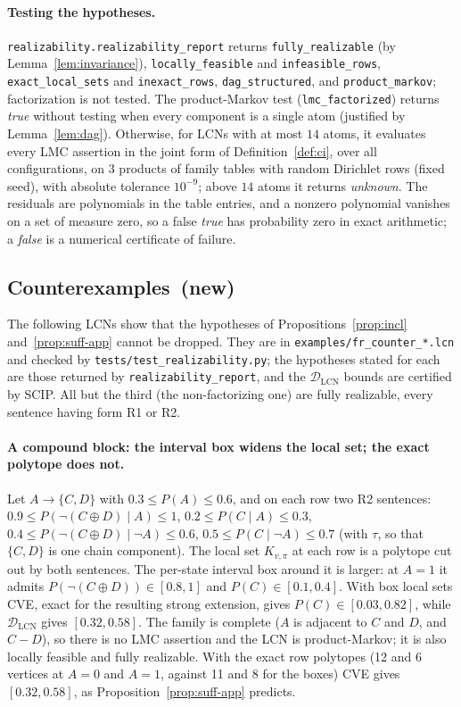 \documentclass{article} %
\DeclareRobustCommand{\rev}[1]{{\color{blue}#1}}
\newcommand{\newtag}{\texorpdfstring{~\rev{(new)}}{}}
\newcommand{\DLCN}{\mathcal{D}_{\mathrm{LCN}}}
\begin{document}
\paragraph{Testing the hypotheses.} \texttt{realizability.realizability\_report} returns
\texttt{fully\_realizable} (by Lemma~\ref{lem:invariance}), \texttt{locally\_feasible} and
\texttt{infeasible\_rows}, \texttt{exact\_local\_sets} and \texttt{inexact\_rows},
\texttt{dag\_structured}, and \texttt{product\_markov}; factorization is not tested. The
product-Markov test (\texttt{lmc\_factorized}) returns \emph{true} without testing when every
component is a single atom (justified by Lemma~\ref{lem:dag}). Otherwise, for LCNs with at most $14$
atoms, it evaluates every LMC assertion in the joint form of Definition~\ref{def:ci}, over all
configurations, on $3$ products of family tables with random Dirichlet rows (fixed seed), with
absolute tolerance $10^{-9}$; above $14$ atoms it returns \emph{unknown}. The residuals are
polynomials in the table entries, and a nonzero polynomial vanishes on a set of measure zero, so a
false \emph{true} has probability zero in exact arithmetic; a \emph{false} is a numerical certificate
of failure.

\subsection{Counterexamples\newtag}\label{sec:fr-counter}

The following LCNs show that the hypotheses of Propositions~\ref{prop:incl} and~\ref{prop:suff-app}
cannot be dropped. They are in \texttt{examples/fr\_counter\_*.lcn} and checked by
\texttt{tests/test\_realizability.py}; the hypotheses stated for each are those returned by
\texttt{realizability\_report}, and the $\DLCN$ bounds are certified by SCIP. All but the third
(the non-factorizing one) are fully realizable, every sentence having form R1 or R2.

\paragraph{A compound block: the interval box widens the local set; the exact polytope does not.}
Let $A\to\{C,D\}$ with $0.3\le P(A)\le0.6$, and on each row two R2 sentences:
$0.9\le P(\lnot(C\oplus D)\mid A)\le1$, $0.2\le P(C\mid A)\le0.3$,
$0.4\le P(\lnot(C\oplus D)\mid\lnot A)\le0.6$, $0.5\le P(C\mid\lnot A)\le0.7$ (with $\tau$, so that
$\{C,D\}$ is one chain component). The local set $K_{v,\pi}$ at each row is a polytope cut out by both
sentences. The per-state interval box around it is larger: at $A{=}1$ it admits
$P(\lnot(C\oplus D))\in[0.8,1]$ and $P(C)\in[0.1,0.4]$. With box local sets CVE, exact for the
resulting strong extension, gives $P(C)\in[0.03,0.82]$, while $\DLCN$ gives $[0.32,0.58]$. The family
is complete ($A$ is adjacent to $C$ and $D$, and $C - D$), so there is no LMC assertion and the LCN is
product-Markov; it is also locally feasible and fully realizable. With the exact row polytopes (12 and
6 vertices at $A{=}0$ and $A{=}1$, against 11 and 8 for the boxes) CVE gives $[0.32,0.58]$, as
Proposition~\ref{prop:suff-app} predicts.
\end{document}
